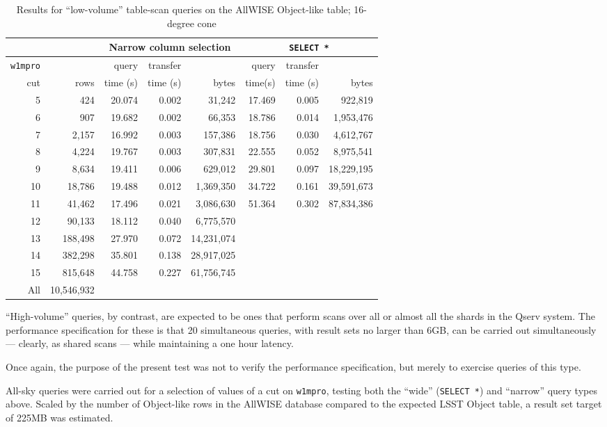\begin{table}[h]
\centering
\begin{tabular}{r r r r r r r r}
 & & \multicolumn{3}{c}{Narrow column selection} & \multicolumn{3}{c}{\texttt{SELECT *}} \\ \hline
\texttt{w1mpro} &  & query & transfer &  & query & transfer &  \\
cut & rows & time (s) & time (s) & bytes & time(s) & time (s) & bytes \\ \hline
5 & 424 & 20.074 & 0.002 & 31,242 & 17.469 & 0.005 & 922,819 \\
6 & 907 & 19.682 & 0.002 & 66,353 & 18.786 & 0.014 & 1,953,476 \\
7 & 2,157 & 16.992 & 0.003 & 157,386 & 18.756 & 0.030 & 4,612,767 \\
8 & 4,224 & 19.767 & 0.003 & 307,831 & 22.555 & 0.052 & 8,975,541 \\
9 & 8,634 & 19.411 & 0.006 & 629,012 & 29.801 & 0.097 & 18,229,195 \\
10 & 18,786 & 19.488 & 0.012 & 1,369,350 & 34.722 & 0.161 & 39,591,673 \\
11 & 41,462 & 17.496 & 0.021 & 3,086,630 & 51.364 & 0.302 & 87,834,386 \\
12 & 90,133 & 18.112 & 0.040 & 6,775,570 \\
13 & 188,498 & 27.970 & 0.072 & 14,231,074 \\
14 & 382,298 & 35.801 & 0.138 & 28,917,025 \\
15 & 815,648 & 44.758 & 0.227 & 61,756,745 \\
All & 10,546,932 \\
\end{tabular}
\caption{Results for ``low-volume'' table-scan queries on the AllWISE Object-like table; 16-degree cone}
\label{tab:lsp-00-10-16-degree-scans}
\end{table}

``High-volume'' queries, by contrast, are expected to be ones that perform scans over all or almost all the shards in the Qserv system.
The performance specification for these is that 20 simultaneous queries, with result sets no larger than 6GB,
can be carried out simultaneously --- clearly, as shared scans --- while maintaining a one hour latency.

Once again, the purpose of the present test was not to verify the performance specification,
but merely to exercise queries of this type.

All-sky queries were carried out for a selection of values of a cut on \verb|w1mpro|,
testing both the ``wide'' (\texttt{SELECT *}) and ``narrow'' query types above.
Scaled by the number of Object-like rows in the AllWISE database compared to the expected LSST Object table,
a result set target of 225MB was estimated.

